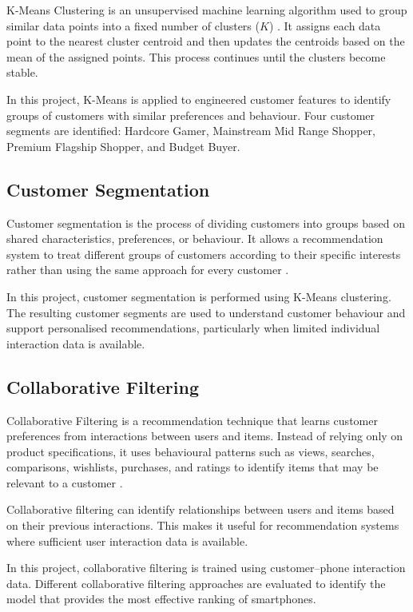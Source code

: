 \documentclass[12pt]{report}
\numberwithin{figure}{chapter}
\numberwithin{table}{chapter}
\numberwithin{equation}{chapter}
\begin{document}
K-Means Clustering is an unsupervised machine learning algorithm used to group similar data points into a fixed number of clusters ($K$) \cite{macqueen}. It assigns each data point to the nearest cluster centroid and then updates the centroids based on the mean of the assigned points. This process continues until the clusters become stable.

In this project, K-Means is applied to engineered customer features to identify groups of customers with similar preferences and behaviour. Four customer segments are identified: Hardcore Gamer, Mainstream Mid Range Shopper, Premium Flagship Shopper, and Budget Buyer.

\subsection{Customer Segmentation}

Customer segmentation is the process of dividing customers into groups based on shared characteristics, preferences, or behaviour. It allows a recommendation system to treat different groups of customers according to their specific interests rather than using the same approach for every customer \cite{joung}.

In this project, customer segmentation is performed using K-Means clustering. The resulting customer segments are used to understand customer behaviour and support personalised recommendations, particularly when limited individual interaction data is available.

\subsection{Collaborative Filtering}

Collaborative Filtering is a recommendation technique that learns customer preferences from interactions between users and items. Instead of relying only on product specifications, it uses behavioural patterns such as views, searches, comparisons, wishlists, purchases, and ratings to identify items that may be relevant to a customer \cite{resnick}.

Collaborative filtering can identify relationships between users and items based on their previous interactions. This makes it useful for recommendation systems where sufficient user interaction data is available.

In this project, collaborative filtering is trained using customer--phone interaction data. Different collaborative filtering approaches are evaluated to identify the model that provides the most effective ranking of smartphones.
\end{document}
